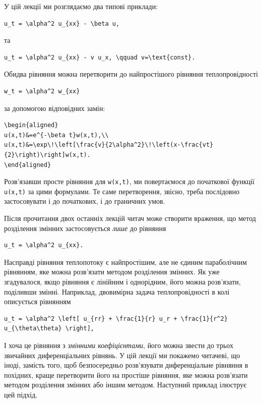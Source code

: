 \documentclass[
  ukrainian,
]{article}
\begin{document}
У цій лекції ми розглядаємо два типові приклади:

\begin{verbatim}
u_t = \alpha^2 u_{xx} - \beta u,
\end{verbatim}

та

\begin{verbatim}
u_t = \alpha^2 u_{xx} - v u_x, \qquad v=\text{const}.
\end{verbatim}

Обидва рівняння можна перетворити до найпростішого рівняння
теплопровідності

\begin{verbatim}
w_t = \alpha^2 w_{xx}
\end{verbatim}

за допомогою відповідних замін:

\begin{verbatim}
\begin{aligned}
u(x,t)&=e^{-\beta t}w(x,t),\\
u(x,t)&=\exp\!\left[\frac{v}{2\alpha^2}\!\left(x-\frac{vt}{2}\right)\right]w(x,t).
\end{aligned}
\end{verbatim}

Розв'язавши просте рівняння для \texttt{w(x,t)}, ми повертаємося до
початкової функції \texttt{u(x,t)} за цими формулами. Те саме
перетворення, звісно, треба послідовно застосовувати і до початкових, і
до граничних умов.

Після прочитання двох останніх лекцій читач може створити враження, що
метод розділення змінних застосовується \emph{лише} до рівняння

\begin{verbatim}
u_t = \alpha^2 u_{xx}.
\end{verbatim}

Насправді рівняння теплопотоку є найпростішим, але не єдиним
параболічним рівнянням, яке можна розв'язати методом розділення змінних.
Як уже згадувалося, якщо рівняння є лінійним і однорідним, його можна
розв'язати, поділивши змінні. Наприклад, двовимірна задача
теплопровідності в колі описується рівнянням

\begin{verbatim}
u_t = \alpha^2 \left[ u_{rr} + \frac{1}{r} u_r + \frac{1}{r^2} u_{\theta\theta} \right],
\end{verbatim}

І хоча це рівняння з \emph{змінними коефіцієнтами}, його можна звести до
трьох звичайних диференціальних рівнянь. У цій лекції ми покажемо
читачеві, що іноді, замість того, щоб безпосередньо розв'язувати
диференціальне рівняння в похідних, краще перетворити його на простіше
рівняння, яке можна розв'язати методом розділення змінних або іншим
методом. Наступний приклад ілюструє цей підхід.
\end{document}
